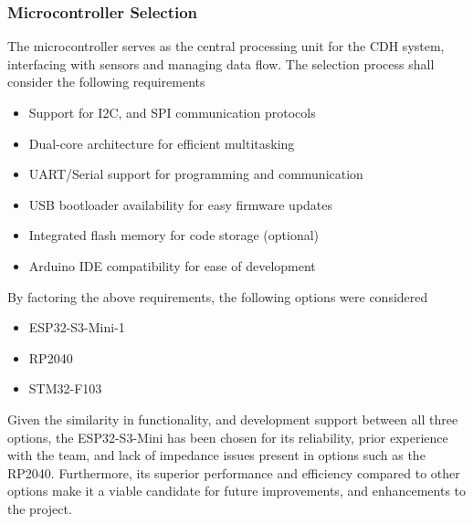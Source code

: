 \documentclass{report}
\begin{document}
                \subsubsection{Microcontroller Selection}
                    The microcontroller serves as the central processing unit for the 
                    CDH system, interfacing with sensors and managing data flow.
                    The selection process shall consider the following requirements
                    \begin{itemize}
                        \item Support for I2C, and SPI communication protocols
                        \item Dual-core architecture for efficient multitasking 
                        \item UART/Serial support for programming and communication
                        \item USB bootloader availability for easy firmware updates
                        \item Integrated flash memory for code storage (optional)
                        \item Arduino IDE compatibility for ease of development
                    \end{itemize}
                    By factoring the above requirements, the following options
                    were considered
                    \begin{itemize}
                        \item ESP32-S3-Mini-1
                        \item RP2040
                        \item STM32-F103
                    \end{itemize}
                    Given the similarity in functionality, and development support between
                    all three options, the ESP32-S3-Mini has been chosen for its reliability, 
                    prior experience with the team, and lack of impedance issues present in 
                    options such as the RP2040. Furthermore, its superior performance and efficiency
                    compared to other options make it a viable candidate for future improvements,
                    and enhancements to the project.
\end{document}
